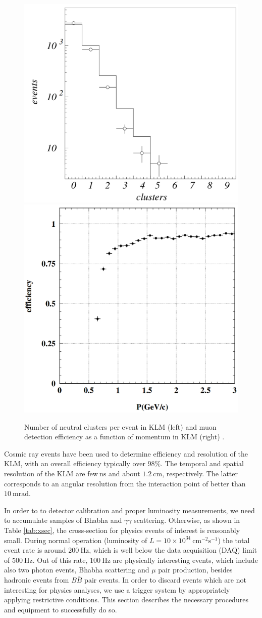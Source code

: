 \documentclass[headings=standardclasses,headings=big,oneside,a4paper,openany,12pt]{scrbook}
\newcommand {\e}[1]{\mathrm{~#1}}
\newcommand {\E}[1]{\times 10^{#1}}
\begin{document}
\begin{figure}[H]
	\centering
	\captionsetup{width=0.8\linewidth}
	\includegraphics[width=0.48\linewidth,trim = 0cm -1.5cm 0cm 0cm]{fig/setup/KLM_clusters}
	\includegraphics[width=0.48\linewidth]{fig/setup/KLM_efficiency}
	\caption{Number of neutral clusters per event in KLM (left) and muon detection efficiency as a function of momentum in KLM (right) \cite{ABASHIAN2002117}.}
	\label{fig:KLM_eff}
\end{figure}

Cosmic ray events have been used to determine efficiency and resolution of the KLM, with an overall efficiency typically over $98\%$. The temporal and spatial resolution of the KLM are few$\e{ns}$ and about $1.2\e{cm}$, respectively. The latter corresponds to an angular resolution from the interaction point of better than $10\e{mrad}$.

In order to to detector calibration and proper luminosity measurements, we need to accumulate samples of Bhabha and $\gamma\gamma$ scattering. Otherwise, as shown in Table \ref{tab:xsec}, the cross-section for physics events of interest is reasonably small. During normal operation (luminosity of $L = 10\E{34}\e{cm^{-2}s^{-1}}$) the total event rate is around $200\e{Hz}$, which is well below the data acquisition (DAQ) limit of $500\e{Hz}$. Out of this rate, $100\e{Hz}$ are physically interesting events, which include also two photon events, Bhabha scattering and $\mu$ pair production, besides hadronic events from $B \bar B$ pair events. In order to discard events which are not interesting for physics analyses, we use a trigger system by appropriately applying restrictive conditions. This section describes the necessary procedures and equipment to successfully do so.
\end{document}
